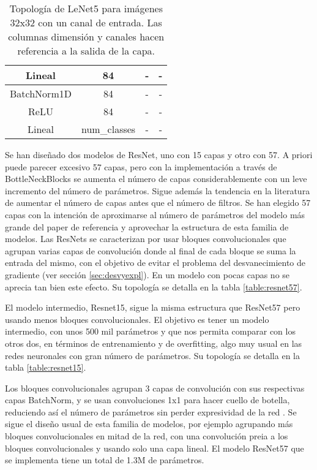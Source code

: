 \begin{table}[]
\begin{tabular}{|c|c|c|c|}
Lineal                         & 84                                  & -                                & -                                 \\ \hline
BatchNorm1D                    & 84                                  & -                                & -                                 \\ \hline
ReLU                           & 84                                  & -                                & -                                 \\ \hline
Lineal                         & num\_classes                        & -                                & -                                 \\ \hline
\end{tabular}
\caption{Topología de LeNet5 para imágenes 32x32 con un canal de entrada. Las columnas dimensión y canales hacen referencia a la salida de la capa.}
\label{table:lenet5}
\end{table}


Se han diseñado dos modelos de ResNet, uno con 15 capas y otro con 57. A priori puede parecer excesivo 57 capas, pero con la implementación a través de BottleNeckBlocks se aumenta el número de capas considerablemente con un leve incremento del número de parámetros. Sigue además la tendencia en la literatura de aumentar el número de capas antes que el número de filtros. Se han elegido 57 capas con la intención de aproximarse al número de parámetros del modelo más grande del paper de referencia y aprovechar la estructura de esta familia de modelos. Las ResNets se caracterizan por usar bloques convolucionales que agrupan varias capas de convolución donde al final de cada bloque se suma la entrada del mismo, con el objetivo de evitar el problema del desvanecimiento de gradiente (ver sección \ref{sec:desvyexpl}). En un modelo con pocas capas no se aprecia tan bien este efecto. Su topología se detalla en la tabla \ref{table:resnet57}.

El modelo intermedio, Resnet15, sigue la misma estructura que ResNet57 pero usando menos bloques convolucionales. El objetivo es tener un modelo intermedio, con unos 500 mil parámetros y que nos permita comparar con los otros dos, en términos de entrenamiento y de overfitting, algo muy usual en las redes neuronales con gran número de parámetros.  Su topología se detalla en la tabla \ref{table:resnet15}.

Los bloques convolucionales agrupan 3 capas de convolución con sus respectivas capas BatchNorm, y se usan convoluciones 1x1 para hacer cuello de botella, reduciendo así el número de parámetros sin perder expresividad de la red \cite{bottleorig, bottlegoogle}. Se sigue el diseño usual de esta familia de modelos, por ejemplo agrupando más bloques convolucionales en mitad de la red, con una convolución preia a los bloques convolucionales y usando solo una capa lineal. El modelo ResNet57 que se implementa tiene un total de 1.3M de parámetros. 

